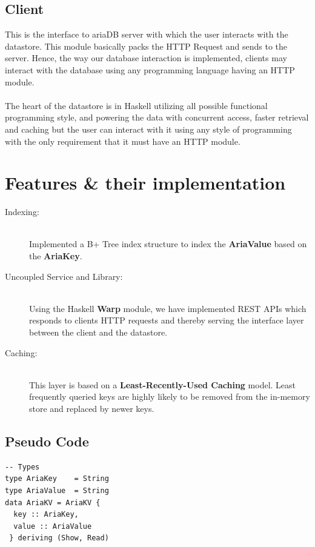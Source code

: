 \documentclass[a0,portrait]{a0poster}
\begin{document}
\begin{multicols}{2}
\subsection*{Client}
This is the interface to ariaDB server with which the user interacts with the datastore. This module basically packs the HTTP Request and sends to the server. Hence, the way our database interaction is implemented, clients may interact with the database using any programming language having an HTTP module.\\
\\
The heart of the datastore is in Haskell utilizing all possible functional programming style, and powering the data with concurrent access, faster retrieval and caching but the user can interact with it using any style of programming with the only requirement that it must have an HTTP module.

\section*{Features \& their implementation}
\begin{description}
  \item[Indexing:] \hfill \\
  Implemented a B+ Tree index structure to index the \textbf{AriaValue} based on the \textbf{AriaKey}.
  \item[Uncoupled Service and Library:] \hfill \\
  Using the Haskell \textbf{Warp} module, we have implemented REST APIs which responds to clients HTTP requests and thereby serving the interface layer between the client and the datastore.
  \item[Caching:] \hfill \\
  This layer is based on a \textbf{Least-Recently-Used Caching} model. Least frequently queried keys are highly likely to be removed from the in-memory store and replaced by newer keys. 
\end{description}

\subsection*{Pseudo Code}
\begin{minipage}[b]{0.5\linewidth}
\begin{verbatim}
-- Types
type AriaKey    = String
type AriaValue  = String
data AriaKV = AriaKV {
  key :: AriaKey,
  value :: AriaValue
 } deriving (Show, Read)


\end{verbatim}
\end{minipage}
\end{multicols}
\end{document}
